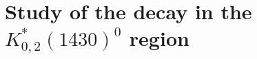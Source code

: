 \section{Study of the decay \BdToKpimm in the $K^{*}_{0,2}(1430)^{0}$ region}
\label{sec:kpimm}










